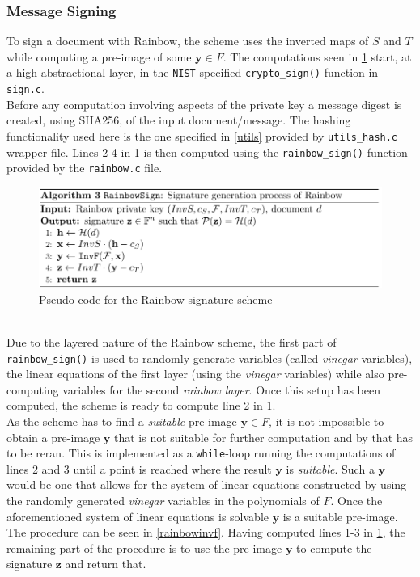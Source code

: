 \subsubsection{Message Signing}
To sign a document with Rainbow, the scheme uses the inverted maps of $S$ and $T$ while computing a pre-image of some $\textbf{y} \in F$. The computations seen in \cref{rainbowsign} start, at a high abstractional layer, in the \texttt{NIST}-specified \texttt{crypto\_sign()} function in \texttt{sign.c}.\medskip\\
Before any computation involving aspects of the private key a message digest is created, using SHA256, of the input document/message. The hashing functionality used here is the one specified in \cref{utils} provided by \texttt{utils\_hash.c} wrapper file. Lines 2-4 in \cref{rainbowsign} is then computed using the \texttt{rainbow\_sign()} function provided by the \texttt{rainbow.c} file.
\begin{figure}[h]
    \centering
    \includegraphics[width=\textwidth]{resources/rainbowsign.png}
    \caption{Pseudo code for the Rainbow signature scheme}
    \label{rainbowsign}
\end{figure}\\
Due to the layered nature of the Rainbow scheme, the first part of \texttt{rainbow\_sign()} is used to randomly generate variables (called \emph{vinegar} variables), the linear equations of the first layer (using the \emph{vinegar} variables) while also pre-computing variables for the second \emph{rainbow layer}. Once this setup has been computed, the scheme is ready to compute line 2 in \cref{rainbowsign}.\medskip\\
As the scheme has to find a \emph{suitable} pre-image $\textbf{y} \in F$, it is not impossible to obtain a pre-image $\textbf{y}$ that is not suitable for further computation and by that has to be reran. This is implemented as a \texttt{while}-loop running the computations of lines 2 and 3 until a point is reached where the result $\textbf{y}$ is \emph{suitable}. Such a $\textbf{y}$ would be one that allows for the system of linear equations constructed by using the randomly generated \emph{vinegar} variables in the polynomials of $F$. Once the aforementioned system of linear equations is solvable $\textbf{y}$ is a suitable pre-image. The procedure can be seen in \cref{rainbowinvf}. Having computed lines 1-3 in \cref{rainbowsign}, the remaining part of the procedure is to use the pre-image $\textbf{y}$ to compute the signature $\textbf{z}$ and return that.
